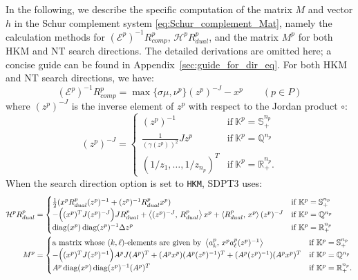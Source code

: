 In the following, we describe the specific computation of the matrix $M$ and vector $h$ in the Schur complement system \eqref{eq:Schur_complement_Mat}, namely the calculation methods for $(\mathcal{E}^p)^{-1}R^p_{comp}$, $\mathcal{H}^p R^p_{dual}$, and the matrix $M^p$ for both HKM and NT search directions. 
The detailed derivations are omitted here; a concise guide can be found in Appendix~\ref{sec:guide_for_dir_eq}. 
For both HKM and NT search directions, we have:
\begin{equation}
    (\mathcal{E}^p)^{-1}R^p_{comp} = \max\{\sigma\mu, \nu^p\}(z^p)^{-J} - x^p \qquad (p \in P)
    \label{eq:Einv_Rcomp}
\end{equation}
where $(z^p)^{-J}$ is the inverse element of $z^p$ with respect to the Jordan product $\circ$:
\[
    (z^p)^{-J} = \begin{cases}
        (z^p)^{-1} & \text{if} ~ \mathbb{K}^p=\mathbb{S}^{n_p}_+ \\
        \frac{1}{(\gamma(z^p))^2} J z^p & \text{if} ~ \mathbb{K}^p=\mathbb{Q}^{n_p} \\
        (1/z_1, \ldots, 1/z_{n_p})^T & \text{if} ~ \mathbb{K}^p=\mathbb{R}^{n_p}_+.
    \end{cases}
\]
When the search direction option is set to \texttt{HKM}, SDPT3 uses:
\begin{align}
    \mathcal{H}^p R^p_{dual} &= \begin{cases}
        \frac{1}{2}(x^p R^p_{dual} (z^p)^{-1} + (z^p)^{-1} R^p_{dual} x^p) & \text{if} ~ \mathbb{K}^p=\mathbb{S}^{n_p}_+\\
        - \Big( (x^p)^T J (z^p)^{-J} \Big) J R^p_{dual} + \left\langle (z^p)^{-J}, \, R^p_{dual} \right\rangle x^p + \left\langle R^p_{dual}, \, x^p \right\rangle (z^p)^{-J} & \text{if} ~ \mathbb{K}^p=\mathbb{Q}^{n_p}\\
        \operatorname{diag}(x^p) \operatorname{diag}(z^p)^{-1} \Delta z^p & \text{if} ~ \mathbb{K}^p=\mathbb{R}^{n_p}_+
    \end{cases} \label{eq:HKM_HRd}\\
    M^p &= \begin{cases} 
        \text{a matrix whose $(k,\ell)$-elements are given by } \left\langle a^p_k, \, x^p a^p_\ell (z^p)^{-1} \right\rangle & \text{if} ~ \mathbb{K}^p=\mathbb{S}^{n_p}_+ \\
        -\Big( (x^p)^T J (z^p)^{-1} \Big) A^p J (A^p)^T + (A^p x^p)(A^p (z^p)^{-1})^T + (A^p (z^p)^{-1})(A^p x^p)^T& \text{if} ~ \mathbb{K}^p=\mathbb{Q}^{n_p} \\
        A^p \operatorname{diag}(x^p) \operatorname{diag}(z^p)^{-1} (A^p)^T & \text{if} ~ \mathbb{K}^p=\mathbb{R}^{n_p}_+.
    \end{cases}
\end{align}
